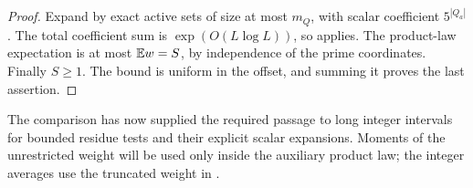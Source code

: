 \begin{proof}
Expand by exact active sets of size at most $m_Q$, with scalar
coefficient $5^{|Q_a|}$.  The total coefficient sum is
$\exp(O(L\log L))$, so  applies.
The product-law expectation is at most $\mathbb E w=S$, by independence
of the prime coordinates.  Finally $S\ge1$.  The bound is uniform
in the offset, and summing it proves the last assertion.
\end{proof}

The comparison has now supplied the required passage to long integer
intervals for bounded residue tests and their explicit scalar
expansions.  Moments of the unrestricted weight will be used only
inside the auxiliary product law; the integer averages use the
truncated weight in .
